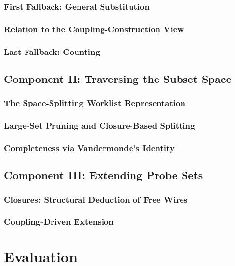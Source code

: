 \documentclass{report}
\begin{document}
  \subsection{First Fallback: General Substitution}
  \subsection{Relation to the Coupling-Construction View}
  \subsection{Last Fallback: Counting}
\section{Component II: Traversing the Subset Space} %
  \subsection{The Space-Splitting Worklist Representation}
  \subsection{Large-Set Pruning and Closure-Based Splitting}
  \subsection{Completeness via Vandermonde's Identity}
\section{Component III: Extending Probe Sets}
  \subsection{Closures: Structural Deduction of Free Wires}
  \subsection{Coupling-Driven Extension}


\chapter{Evaluation}
\end{document}
